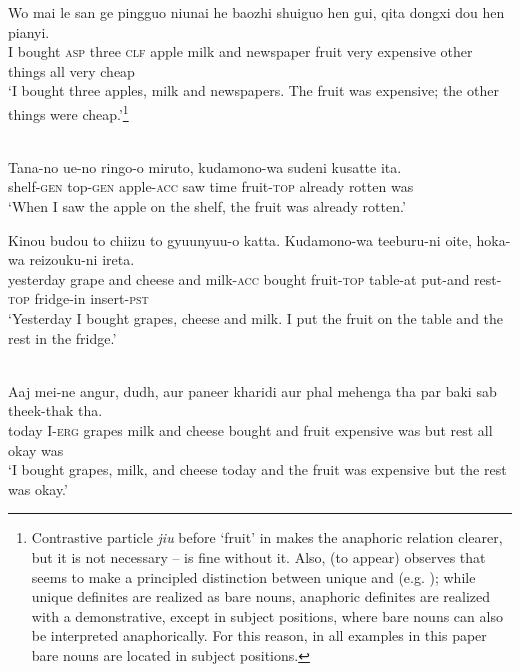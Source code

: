 \documentclass[output=paper,
modfonts
]{langscibook}
\begin{document}
	\ex \label{ex:despic:20b} 
	\gll
	{Wo} {mai} {le} {san} {ge} {pingguo} {niunai} {he} {baozhi} {shuiguo} {hen} {gui,} {qita} {dongxi} {dou} {hen} {pianyi.} \\ 
	I bought \textsc{asp} three \textsc{clf} apple milk and newspaper fruit very expensive other things all very cheap \\
	\glt `I bought three apples, milk and newspapers. The fruit was expensive; the other things were cheap.'\footnote{\label{ft8}Contrastive particle \textit{jiu} before `fruit' in  makes the anaphoric relation clearer, but it is not necessary --  is fine without it. Also, \citeauthor{Jenkstoappear} (to appear) observes that  seems to make a principled distinction between unique and  (e.g. \citealt{Schwarz2009}); while unique definites are realized as bare nouns, anaphoric definites are realized with a demonstrative, except in subject positions, where bare nouns can also be interpreted anaphorically. For this reason, in all  examples in this paper bare nouns are located in subject positions.} 
	\z 
	\z 
	
	\ea \label{ex:despic:21}
	 \\
	\ea 
	\gll 
	{Tana}-{no} {ue}-{no} {ringo-o} {miruto}, {kudamono}-{wa} {sudeni} {kusatte} {ita}. \\
	shelf-\textsc{gen} {top}-\textsc{gen} apple-\textsc{acc} {saw time} fruit-\textsc{top} already rotten was \\ 
	\glt `When I saw the apple on the shelf, the fruit was already rotten.'
	
	\ex 
	\gll 
	{Kinou} {budou} {to} {chiizu} {to} {gyuunyuu-o} {katta}. {Kudamono-wa} {teeburu-ni} {oite}, {hoka-wa} {reizouku-ni} {ireta}. \\
	yesterday grape and cheese and milk-\textsc{acc} bought fruit-\textsc{top} table-at put-and rest-\textsc{top} fridge-in insert-\textsc{pst} \\
	\glt `Yesterday I bought grapes, cheese and milk. I put the fruit on the table and the rest in the fridge.'
	\z 
	\z 
	
	\ea \label{ex:despic:22}
	 \\
	\gll 
	{Aaj} {mei-ne} {angur}, {dudh}, {aur} {paneer} {kharidi} {aur} {phal} {mehenga} {tha} {par} {baki} {sab} {theek-thak} {tha.} \\
	today I-\textsc{erg} grapes milk and cheese bought and fruit expensive was but rest all okay was \\ 
	\glt `I bought grapes, milk, and cheese today and the fruit was expensive but the rest was okay.'
	\z 
	
\end{document}
